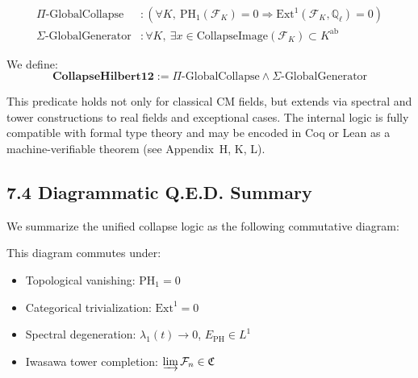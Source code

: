 \documentclass[11pt]{article}
\begin{document}
\begin{align*}
\Pi\text{-GlobalCollapse} &\colon \left( \forall K,\ \mathrm{PH}_1(\mathcal{F}_K) = 0 \Rightarrow \mathrm{Ext}^1(\mathcal{F}_K, \mathbb{Q}_\ell) = 0 \right) \\
\Sigma\text{-GlobalGenerator} &\colon \forall K,\ \exists x \in \text{CollapseImage}(\mathcal{F}_K) \subset K^{\mathrm{ab}}
\end{align*}

We define:
\[
\textbf{CollapseHilbert12} := \Pi\text{-GlobalCollapse} \wedge \Sigma\text{-GlobalGenerator}
\]

This predicate holds not only for classical CM fields, but extends via spectral and tower constructions to real fields and exceptional cases.  
The internal logic is fully compatible with formal type theory and may be encoded in Coq or Lean as a machine-verifiable theorem (see Appendix~H, K, L).

\medskip

\subsection{7.4 Diagrammatic Q.E.D. Summary}
\label{subsec:collapse-qed-diagram}

We summarize the unified collapse logic as the following commutative diagram:

\begin{center}
\end{center}

This diagram commutes under:
\begin{itemize}
  \item Topological vanishing: \( \mathrm{PH}_1 = 0 \)
  \item Categorical trivialization: \( \mathrm{Ext}^1 = 0 \)
  \item Spectral degeneration: \( \lambda_1(t) \to 0 \), \( E_{\mathrm{PH}} \in L^1 \)
  \item Iwasawa tower completion: \( \varinjlim \mathcal{F}_n \in \mathfrak{C} \)
\end{itemize}
\end{document}

